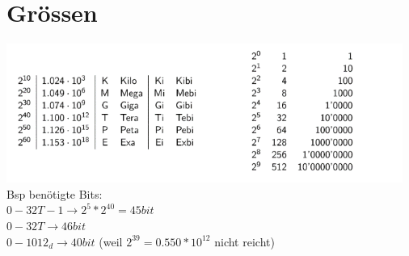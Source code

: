 \section{Grössen}
\includegraphics[width=\columnwidth]{img/potenzgroessen.png}
Bsp benötigte Bits:\\
$0-32T -1 \rightarrow 2^5 * 2^{40} = 45 bit$\\
$0-32T \rightarrow 46 bit$\\
$0-1012_d \rightarrow 40 bit$ (weil $2^{39} = 0.550 * 10^{12}$ nicht reicht)